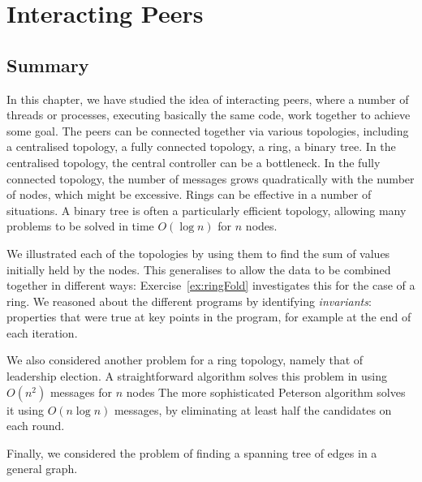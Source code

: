 \chapter{Interacting Peers}



\section{Summary}

In this chapter, we have studied the idea of interacting peers, where a number
of threads or processes, executing basically the same code, work together to
achieve some goal.  The peers can be connected together via various
topologies, including a centralised topology, a fully connected topology, a
ring, a binary tree.  In the centralised topology,
the central controller can be a bottleneck.  In the fully connected topology,
the number of messages grows quadratically with the number of nodes, which
might be excessive.  Rings can be effective in a number of situations.  A
binary tree is often a particularly efficient topology, allowing many problems
to be solved in time $O(\log n)$ for $n$ nodes.

We illustrated each of the topologies by using them to find the sum of
values initially held by the nodes.  This generalises to allow the data to be
combined together in different ways: Exercise~\ref{ex:ringFold} investigates
this for the case of a ring.
We reasoned about the different programs by identifying \emph{invariants}:
properties that were true at key points in the program, for example at the end
of each iteration. 

We also considered another problem for a ring topology, namely that of
leadership election.  A straightforward algorithm solves this problem in using
$O(n^2)$ messages for $n$ nodes  The more sophisticated Peterson algorithm
solves it using $O(n \log n)$ messages, by eliminating at least half the
candidates on each round.

Finally, we considered the problem of finding a spanning tree of edges in a
general graph. 



\exercises














